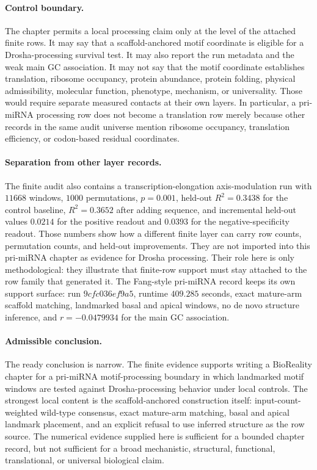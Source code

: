 \paragraph{Control boundary.}
The chapter permits a local processing claim only at the level of the attached finite rows. It may say that a scaffold-anchored motif coordinate is eligible for a Drosha-processing survival test. It may also report the run metadata and the weak main GC association. It may not say that the motif coordinate establishes translation, ribosome occupancy, protein abundance, protein folding, physical admissibility, molecular function, phenotype, mechanism, or universality. Those would require separate measured contacts at their own layers. In particular, a pri-miRNA processing row does not become a translation row merely because other records in the same audit universe mention ribosome occupancy, translation efficiency, or codon-based residual coordinates.

\paragraph{Separation from other layer records.}
The finite audit also contains a transcription-elongation axis-modulation run with $11668$ windows, $1000$ permutations, $p=0.001$, held-out $R^2=0.3438$ for the control baseline, $R^2=0.3652$ after adding sequence, and incremental held-out values $0.0214$ for the positive readout and $0.0393$ for the negative-specificity readout. Those numbers show how a different finite layer can carry row counts, permutation counts, and held-out improvements. They are not imported into this pri-miRNA chapter as evidence for Drosha processing. Their role here is only methodological: they illustrate that finite-row support must stay attached to the row family that generated it. The Fang-style pri-miRNA record keeps its own support surface: run $9cfc036ef9a5$, runtime $409.285$ seconds, exact mature-arm scaffold matching, landmarked basal and apical windows, no de novo structure inference, and $r=-0.0479934$ for the main GC association.

\paragraph{Admissible conclusion.}
The ready conclusion is narrow. The finite evidence supports writing a BioReality chapter for a pri-miRNA motif-processing boundary in which landmarked motif windows are tested against Drosha-processing behavior under local controls. The strongest local content is the scaffold-anchored construction itself: input-count-weighted wild-type consensus, exact mature-arm matching, basal and apical landmark placement, and an explicit refusal to use inferred structure as the row source. The numerical evidence supplied here is sufficient for a bounded chapter record, but not sufficient for a broad mechanistic, structural, functional, translational, or universal biological claim.